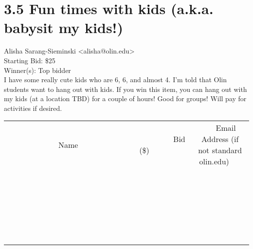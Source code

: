 \documentclass[11pt]{article}
\begin{document}
					\section*{3.5 Fun times with kids (a.k.a. babysit my kids!)}
					Alisha Sarang-Sieminski <alisha@olin.edu> \\
					Starting Bid: \$25 \\
					Winner(s): Top bidder \\
					I have some really cute kids who are 6, 6, and almost 4. I'm told that Olin students want to hang out with kids. If you win this item, you can hang out with my kids (at a location TBD) for a couple of hours! Good for groups! Will pay for activities if desired. \\
					[6ex]
					\begin{tabular}{c c c}
						~~~~~~~~~~~~~Name~~~~~~~~~~~~~ & ~~~~~~~~~Bid (\$)~~~~~~~~~ & ~~~Email Address (if not standard olin.edu)~~~ \\
				
 & & \\
\hline
 & & \\
\hline
 & & \\
\hline
 & & \\
\hline
 & & \\
\hline
 & & \\
\hline
 & & \\
\hline
 & & \\
\hline
 & & \\
\hline
 & & \\
\hline
 & & \\
\hline
 & & \\
\hline
 & & \\
\hline
 & & \\
\hline
 & & \\
\hline
 & & \\
\hline
 & & \\
\hline
 & & \\
\hline
 & & \\
\hline
 & & \\
\hline
 & & \\
\hline
 & & \\
\hline
 & & \\
\hline
 & & \\
\hline
 & & \\
\hline
 & & \\
\hline
					\end{tabular}
					\clearpage
				
\end{document}
